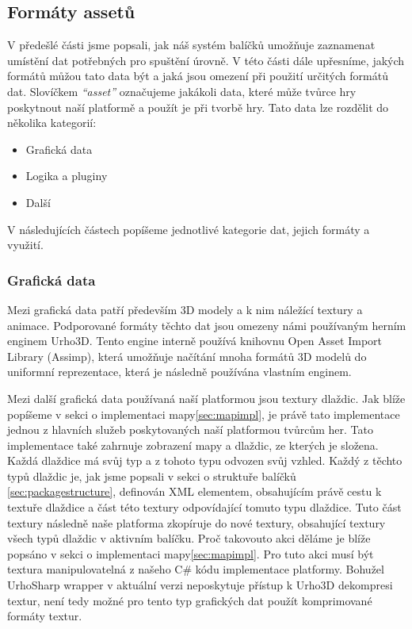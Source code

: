 \subsection{Formáty assetů}
V předešlé části jsme popsali, jak náš systém balíčků umožňuje zaznamenat umístění dat potřebných pro spuštění úrovně. V této části dále upřesníme, jakých formátů můžou tato data být a jaká jsou omezení při použití určitých formátů dat. Slovíčkem \textit{``asset''} označujeme jakákoli data, které může tvůrce hry poskytnout naší platformě a použít je při tvorbě hry. Tato data lze rozdělit do několika kategorií:
\begin{itemize}
	\item Grafická data
	\item Logika a pluginy
	\item Další
\end{itemize}

V následujících částech popíšeme jednotlivé kategorie dat, jejich formáty a využití.

\subsubsection{Grafická data}
Mezi grafická data patří především 3D modely a k nim náležící textury a animace. Podporované formáty těchto dat jsou omezeny námi používaným herním enginem Urho3D. Tento engine interně používá knihovnu Open Asset Import Library (Assimp)\citep{site:assimp}, která umožňuje načítání mnoha formátů 3D modelů do uniformní reprezentace, která je následně používána vlastním enginem.

Mezi další grafická data používaná naší platformou jsou textury dlaždic. Jak blíže popíšeme v sekci o implementaci mapy\ref{sec:mapimpl}, je právě tato implementace jednou z hlavních služeb poskytovaných naší platformou tvůrcům her. Tato implementace také zahrnuje zobrazení mapy a dlaždic, ze kterých je složena. Každá dlaždice má svůj typ a z tohoto typu odvozen svůj vzhled. Každý z těchto typů dlaždic je, jak jsme popsali v sekci o struktuře balíčků \ref{sec:packagestructure}, definován XML elementem, obsahujícím právě cestu k textuře dlaždice a část této textury odpovídající tomuto typu dlaždice. Tuto část textury následně naše platforma zkopíruje do nové textury, obsahující textury všech typů dlaždic v aktivním balíčku. Proč takovouto akci děláme je blíže popsáno v sekci o implementaci mapy\ref{sec:mapimpl}. Pro tuto akci musí být textura manipulovatelná z našeho C\# kódu implementace platformy. Bohužel UrhoSharp wrapper v aktuální verzi neposkytuje přístup k Urho3D dekompresi textur, není tedy možné pro tento typ grafických dat použít komprimované formáty textur. 

